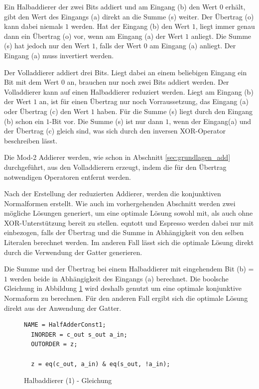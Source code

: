 Ein Halbaddierer der zwei Bits addiert und am Eingang (b) den Wert $0$ erhält, gibt den Wert des Eingangs (a) direkt an die Summe (s) weiter.
Der Übertrag (o) kann dabei niemals $1$ werden. Hat der Eingang (b) den Wert $1$, liegt immer genau dann ein Übertrag (o) vor, wenn am Eingang (a)
der Wert $1$ anliegt. Die Summe (s) hat jedoch nur den Wert $1$, falls der Wert $0$ am Eingang (a) anliegt. Der Eingang (a) muss invertiert werden.

Der Volladdierer addiert drei Bits. Liegt dabei an einem beliebigen Eingang ein Bit mit dem Wert $0$ an, brauchen nur noch zwei Bits addiert werden.
Der Volladdierer kann auf einen Halbaddierer reduziert werden. Liegt am Eingang (b) der Wert $1$ an, ist für einen Übertrag nur noch Vorraussetzung,
das Eingang (a) oder Übertrag (c) den Wert $1$ haben. Für die Summe (s) liegt durch den Eingang (b) schon ein $1$-Bit vor. Die Summe (s) ist nur dann
$1$, wenn der Eingang(a) und der Übertrag (c) gleich sind, was sich durch den inversen XOR-Operator beschreiben lässt.

Die Mod-2 Addierer werden, wie schon in Abschnitt \ref{sec:grundlagen_add} durchgeführt, aus den Volladdierern erzeugt, indem die für den Übertrag
notwendigen Operatoren entfernt werden.

Nach der Erstellung der reduzierten Addierer, werden die konjunktiven Normalformen erstellt. Wie auch im vorhergehenden Abschnitt werden zwei mögliche
Lösungen generiert, um eine optimale Lösung sowohl mit, als auch ohne XOR-Unterstützung bereit zu stellen. eqntott und Espresso werden dabei nur mit
einbezogen, falls der Übertrag und die Summe in Abhängigkeit von den selben Literalen berechnet werden. Im anderen Fall lässt sich die optimale Lösung
direkt durch die Verwendung der Gatter generieren.

Die Summe und der Übertrag bei einem Halbaddierer mit eingehendem Bit (b) = $1$ werden beide in Abhängigkeit des Eingangs (a) berechnet. Die boolsche
Gleichung in Abbildung \ref{fig:halfadder1_qen} wird deshalb genutzt um eine optimale konjunktive Normaform zu berechnen. Für den anderen Fall ergibt
sich die optimale Lösung direkt aus der Anwendung der Gatter. \clearpage
\begin{figure}[!h]
  \centering
  \begin{lstlisting}[]
  NAME = HalfAdderConst1;
  INORDER = c_out s_out a_in;
  OUTORDER = z;

  z = eq(c_out, a_in) & eq(s_out, !a_in);
  \end{lstlisting}
  \caption{Halbaddierer (1) - Gleichung}
  \label{fig:halfadder1_qen}
\end{figure}


